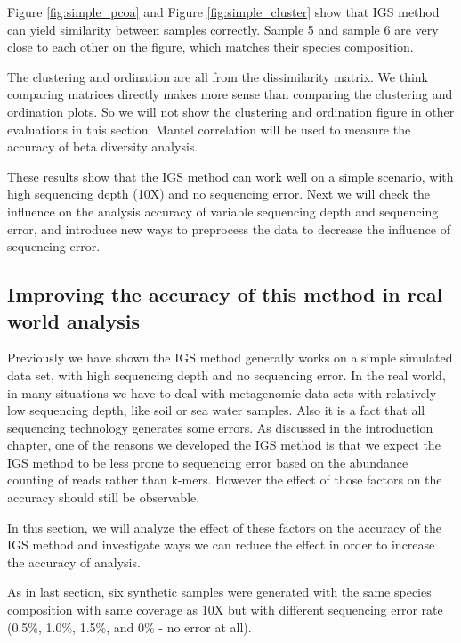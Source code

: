 \documentclass{article}
\begin{document}
Figure \ref{fig:simple_pcoa} and Figure \ref{fig:simple_cluster} show that 
IGS method can yield similarity between samples correctly. Sample 5 and sample 6 are very 
close to each other on the figure, which 
matches their species composition.

The clustering and ordination are all from the dissimilarity matrix. 
We think comparing matrices directly makes more sense than comparing the 
clustering and ordination plots. So we will not show the clustering and 
ordination figure in other evaluations in this section. Mantel correlation will 
be used to measure the accuracy of beta diversity analysis.


These results show that the IGS method can work well on a simple
scenario, with high sequencing depth (10X) and no sequencing error. Next 
we will check the influence on the analysis accuracy of variable sequencing 
depth and sequencing error, and introduce new ways to preprocess the data 
to decrease the influence of sequencing error. 


\subsection{Improving the accuracy of this method in real world analysis}


Previously we have shown the IGS method generally works on a simple simulated
 data set, with high sequencing depth and no sequencing error. In the real world,
in many situations we have to deal with metagenomic data sets with 
relatively low sequencing depth, like soil or sea water samples. 
Also it is a fact that all sequencing technology generates some errors. As 
discussed in the introduction 
chapter, one of the reasons we developed the IGS method is that 
we expect the IGS method to be less prone to
sequencing error based on the 
abundance counting of reads rather than k-mers. However the effect of those factors 
on the accuracy should still be observable.

In this section, we will analyze the effect of these factors on the accuracy of
 the IGS method and investigate ways we can reduce the effect in order to increase the 
accuracy of analysis.

As in last section, six synthetic samples were generated with the same species 
composition with same coverage as 10X but with different sequencing error rate (0.5\%,
 1.0\%, 1.5\%, and 0\% - no error at all).
 
\end{document}
